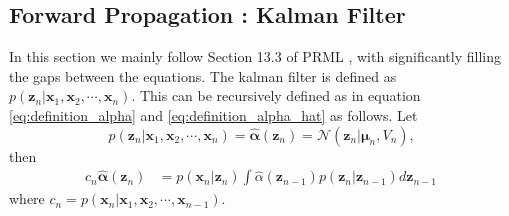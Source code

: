 \documentclass[a4]{article}
\begin{document}
\subsection{Forward Propagation : Kalman Filter}
In this section we mainly follow Section 13.3 of PRML \cite{bishop2007}, with significantly filling the
gaps between the equations.
The kalman filter is defined as $p( \bm{z}_n | \bm{x}_1, \bm{x}_2, \cdots, \bm{x}_n)$.
This can be recursively defined as in equation 
\ref{eq:definition_alpha} and \ref{eq:definition_alpha_hat} as follows.
Let $$p( \bm{z}_n | \bm{x}_1, \bm{x}_2, \cdots, \bm{x}_n) = \hat{\bm{\alpha}}(\bm{z}_n) = \mathcal{N}(\bm{z}_n |\bm{\mu}_n, V_n)\text{,}$$
then
\begin{equation}
\begin{aligned}
c_n\hat{\bm{\alpha}}(\bm{z}_n) &= p(\bm{x}_n|\bm{z}_n)\int\hat{\alpha}(\bm{z}_{n-1})p(\bm{z}_n|\bm{z}_{n-1})d\bm{z}_{n-1}\label{eq:define_c_alpha_hat}
\end{aligned}
\end{equation}
where $c_n = p(\bm{x}_n | \bm{x}_1,  \bm{x}_2, \cdots, \bm{x}_{n-1})$.
\end{document}
